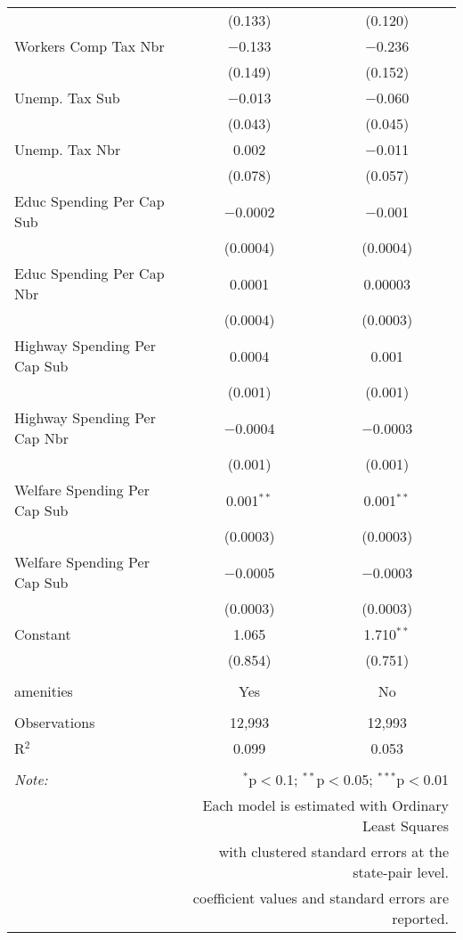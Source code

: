 \begin{table}[!htbp]
\begin{tabular}{@{\extracolsep{5pt}}lcc}
  & (0.133) & (0.120) \\ 
  Workers Comp Tax Nbr & $-$0.133 & $-$0.236 \\ 
  & (0.149) & (0.152) \\ 
  Unemp. Tax Sub & $-$0.013 & $-$0.060 \\ 
  & (0.043) & (0.045) \\ 
  Unemp. Tax Nbr & 0.002 & $-$0.011 \\ 
  & (0.078) & (0.057) \\ 
  Educ Spending Per Cap Sub & $-$0.0002 & $-$0.001 \\ 
  & (0.0004) & (0.0004) \\ 
  Educ Spending Per Cap Nbr & 0.0001 & 0.00003 \\ 
  & (0.0004) & (0.0003) \\ 
  Highway Spending Per Cap Sub & 0.0004 & 0.001 \\ 
  & (0.001) & (0.001) \\ 
  Highway Spending Per Cap Nbr & $-$0.0004 & $-$0.0003 \\ 
  & (0.001) & (0.001) \\ 
  Welfare Spending Per Cap Sub & 0.001$^{**}$ & 0.001$^{**}$ \\ 
  & (0.0003) & (0.0003) \\ 
  Welfare Spending Per Cap Sub & $-$0.0005 & $-$0.0003 \\ 
  & (0.0003) & (0.0003) \\ 
  Constant & 1.065 & 1.710$^{**}$ \\ 
  & (0.854) & (0.751) \\ 
 \hline \\[-1.8ex] 
amenities & Yes & No \\ 
\hline \\[-1.8ex] 
Observations & 12,993 & 12,993 \\ 
R$^{2}$ & 0.099 & 0.053 \\ 
\hline 
\hline \\[-1.8ex] 
\textit{Note:}  & \multicolumn{2}{r}{$^{*}$p$<$0.1; $^{**}$p$<$0.05; $^{***}$p$<$0.01} \\ 
 & \multicolumn{2}{r}{Each model is estimated with Ordinary Least Squares} \\ 
 & \multicolumn{2}{r}{with clustered standard errors at the state-pair level.} \\ 
 & \multicolumn{2}{r}{coefficient values and standard errors are reported.} \\ 
\end{tabular} 
\end{table} 
